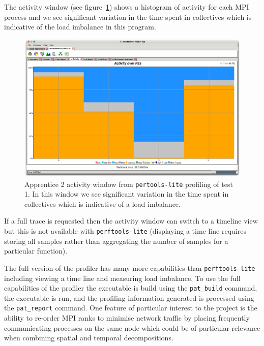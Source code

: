 \documentclass[a4paper,titlepage]{article}
\begin{document}
The activity window (see figure~\ref{fig:app2_activity}) shows a histogram of activity for each MPI process and we see significant variation in the time spent in collectives which is indicative of the load imbalance in this program.
\begin{figure}[htbp]
\begin{center}
\includegraphics[scale=0.3]{figures/app2_activity}
\caption{Apprentice 2 activity window from \texttt{pertools-lite} profiling of test 1. In this window we see significant variation in the time spent in collectives which is indicative of a load imbalance.}
\label{fig:app2_activity}
\end{center}
\end{figure}
If a full trace is requested then the activity window can switch to a timeline view but this is not available with \texttt{perftools-lite} (displaying a time line requires storing all samples rather than aggregating the number of samples for a particular function).

The full version of the profiler has many more capabilities than \texttt{perftools-lite} including viewing a time line and measuring load imbalance. To use the full capabilities of the profiler the executable is build using the \verb+pat_build+ command, the executable is run, and the profiling information generated is processed using the \verb+pat_report+ command. One feature of particular interest to the project is the ability to re-order MPI ranks to minimise network traffic by placing frequently communicating processes on the same node which could be of particular relevance when combining spatial and temporal decompositions. 

\pagebreak

\end{document}
